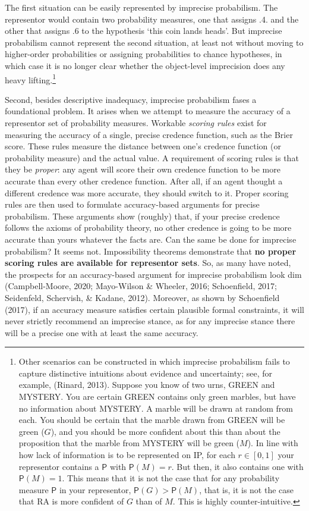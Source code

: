 \documentclass[
  letterpaper,
  DIV=11,
  numbers=noendperiod]{scrartcl}
\newcommand{\pr}[1]{\mathsf{P}(#1)}
\begin{document}
\noindent The first situation can be easily represented by imprecise
probabilism. The representor would contain two probability measures, one
that assigns .4. and the other that assigns .6 to the hypothesis `this
coin lands heads'. But imprecise probabilism cannot represent the second
situation, at least not without moving to higher-order probabilities or
assigning probabilities to chance hypotheses, in which case it is no
longer clear whether the object-level imprecision does any heavy
lifting.\footnote{Other scenarios can be constructed in which imprecise
  probabilism fails to capture distinctive intuitions about evidence and
  uncertainty; see, for example, (Rinard, 2013). Suppose you know of two
  urns, \textsf{GREEN} and \textsf{MYSTERY}. You are certain
  \textsf{GREEN} contains only green marbles, but have no information
  about \textsf{MYSTERY}. A marble will be drawn at random from each.
  You should be certain that the marble drawn from \textsf{GREEN} will
  be green (\(G\)), and you should be more confident about this than
  about the proposition that the marble from \textsf{MYSTERY} will be
  green (\(M\)). In line with how lack of information is to be
  represented on \textsf{IP}, for each \(r\in [0,1]\) your representor
  contains a \(\mathsf{P}\) with \(\pr{M}=r\). But then, it also
  contains one with \(\pr{M}=1\). This means that it is not the case
  that for any probability measure \(\mathsf{P}\) in your representor,
  \(\mathsf{P}(G) > \mathsf{P}(M)\), that is, it is not the case that RA
  is more confident of \(G\) than of \(M\). This is highly
  counter-intuitive.}

Second, besides descriptive inadequacy, imprecise probabilism fases a
foundational problem. It arises when we attempt to measure the accuracy
of a representor set of probability measures. Workable \emph{scoring
rules} exist for measuring the accuracy of a single, precise credence
function, such as the Brier score. These rules measure the distance
between one's credence function (or probability measure) and the actual
value. A requirement of scoring rules is that they be \emph{proper}: any
agent will score their own credence function to be more accurate than
every other credence function. After all, if an agent thought a
different credence was more accurate, they should switch to it. Proper
scoring rules are then used to formulate accuracy-based arguments for
precise probabilism. These arguments show (roughly) that, if your
precise credence follows the axioms of probability theory, no other
credence is going to be more accurate than yours whatever the facts are.
Can the same be done for imprecise probabilism? It seems not.
Impossibility theorems demonstrate that \textbf{no proper scoring rules
are available for representor sets}. So, as many have noted, the
prospects for an accuracy-based argument for imprecise probabilism look
dim (Campbell-Moore, 2020; Mayo-Wilson \& Wheeler, 2016; Schoenfield,
2017; Seidenfeld, Schervish, \& Kadane, 2012). Moreover, as shown by
Schoenfield (2017), if an accuracy measure satisfies certain plausible
formal constraints, it will never strictly recommend an imprecise
stance, as for any imprecise stance there will be a precise one with at
least the same accuracy.
\end{document}
